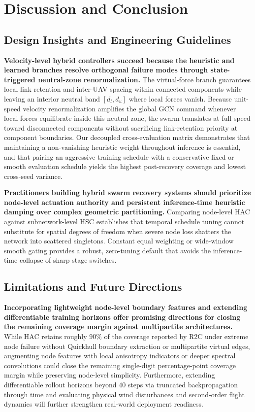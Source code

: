 \documentclass[11pt]{article}
\theoremstyle{plain}
\theoremstyle{definition}
\theoremstyle{remark}
\begin{document}
\section{Discussion and Conclusion}
\label{sec:discussion}
\label{sec:conclusion}

\subsection{Design Insights and Engineering Guidelines}
\textbf{Velocity-level hybrid controllers succeed because the heuristic and learned branches resolve orthogonal failure modes through state-triggered neutral-zone renormalization.} The virtual-force branch guarantees local link retention and inter-UAV spacing within connected components while leaving an interior neutral band $[d_l, d_u]$ where local forces vanish. Because unit-speed velocity renormalization amplifies the global GCN command whenever local forces equilibrate inside this neutral zone, the swarm translates at full speed toward disconnected components without sacrificing link-retention priority at component boundaries. Our decoupled cross-evaluation matrix demonstrates that maintaining a non-vanishing heuristic weight throughout inference is essential, and that pairing an aggressive training schedule with a conservative fixed or smooth evaluation schedule yields the highest post-recovery coverage and lowest cross-seed variance.

\textbf{Practitioners building hybrid swarm recovery systems should prioritize node-level actuation authority and persistent inference-time heuristic damping over complex geometric partitioning.} Comparing node-level HAC against subnetwork-level HSC establishes that temporal schedule tuning cannot substitute for spatial degrees of freedom when severe node loss shatters the network into scattered singletons. Constant equal weighting or wide-window smooth gating provides a robust, zero-tuning default that avoids the inference-time collapse of sharp stage switches.

\subsection{Limitations and Future Directions}
\textbf{Incorporating lightweight node-level boundary features and extending differentiable training horizons offer promising directions for closing the remaining coverage margin against multipartite architectures.} While HAC retains roughly $90\%$ of the coverage reported by R2C under extreme node failure without Quickhull boundary extraction or multipartite virtual edges, augmenting node features with local anisotropy indicators or deeper spectral convolutions could close the remaining single-digit percentage-point coverage margin while preserving node-level simplicity. Furthermore, extending differentiable rollout horizons beyond $40$ steps via truncated backpropagation through time and evaluating physical wind disturbances and second-order flight dynamics will further strengthen real-world deployment readiness.
\end{document}
